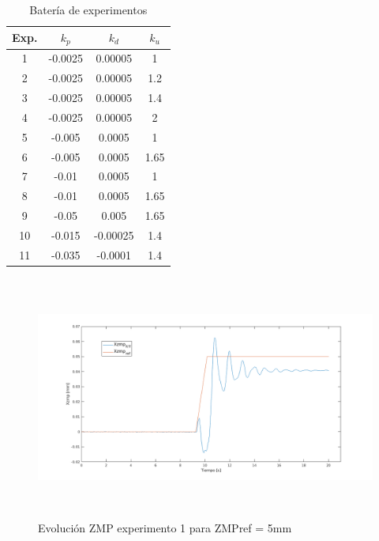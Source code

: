 \begin{table}[H]
\begin{center}
\begin{tabular}{|c|c|c|c|}
\hline
Exp. & $k_p$   & $k_d$    & $k_u$ \\ \hline
1    & -0.0025 & 0.00005  & 1    \\ \hline
2    & -0.0025 & 0.00005  & 1.2  \\ \hline
3    & -0.0025 & 0.00005  & 1.4  \\ \hline
4    & -0.0025 & 0.00005  & 2    \\ \hline
5    & -0.005  & 0.0005   & 1    \\ \hline
6    & -0.005  & 0.0005   & 1.65 \\ \hline
7    & -0.01   & 0.0005   & 1    \\ \hline
8    & -0.01   & 0.0005   & 1.65 \\ \hline
9    & -0.05   & 0.005    & 1.65 \\ \hline
10   & -0.015  & -0.00025 & 1.4  \\ \hline
11   & -0.035  & -0.0001  & 1.4  \\ \hline
\end{tabular}
\end{center}
\caption{Batería de experimentos}
\label{tabla51}
\end{table}

\begin{figure}[H]
\centering
\includegraphics[width=13cm, height=8cm]{imagenes/apartado_5/5.1/55}
\caption{Evolución ZMP experimento 1 para ZMPref = 5mm}
\label{figura55}
\end{figure}

